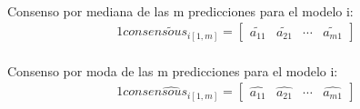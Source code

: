\\
Consenso por mediana de las m predicciones para el modelo i:
\begin{alignat*}{1}
\widetilde{consensous_{i[1,m]}}= \begin{bmatrix} \widetilde{a_{11}} &  \widetilde{a_{21}}  &  \cdots   & \widetilde{a_{m1}} \end{bmatrix} 
\end{alignat*}
\\
Consenso por moda de las m predicciones para el modelo i:
\begin{alignat*}{1}
\widehat{consensous_{i[1,m]}}= \begin{bmatrix} \widehat{a_{11}} &  \widehat{a_{21}}  &  \cdots   & \widehat{a_{m1}} \end{bmatrix} 
\end{alignat*}
\\ \\ \\

